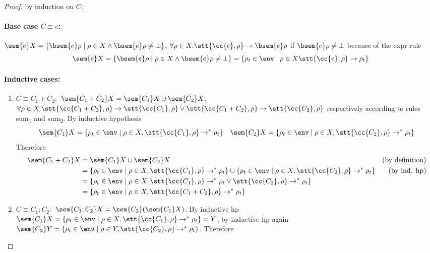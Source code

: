 \begin{proof}
  by induction on \(C\):
  \paragraph*{Base case \(C \equiv e\):\\}
  \(\sem{e}X = \{\bsem{e}\rho \mid \rho \in X \wedge \bsem{e}\rho \neq
  \bot \}\), \(\forall \rho \in X . \stt{\cc{e}, \rho} \to \bsem{e}\rho\)
  if \(\bsem{e}\rho \neq \bot\) because of the expr rule \[\sem{e}X =
  \{\bsem{e}\rho \mid \rho \in X \wedge \bsem{e}\rho \neq \bot \} =
  \{\rho_t \in\env \mid \rho \in X \stt{\cc{e}, \rho} \to \rho_t\}\]
  \paragraph*{Inductive cases:\\}
  \begin{enumerate}
  \item \(C \equiv C_1 + C_2:\) \(\sem{C_1 + C_2}X = \sem{C_1}X \cup
    \sem{C_2}X\), \(\forall \rho \in X . \stt{\cc{C_1 + C_2}, \rho} \to
    \stt{\cc{C_1}, \rho} \vee \stt{\cc{C_1 + C_2}, \rho} \to \stt{\cc{C_2}, \rho}\)
    respectively according to rules sum\textsubscript{1} and
    sum\textsubscript{2}. By inductive hypothesis \[\sem{C_1}X =
    \{\rho_t \in\env \mid \rho \in X , \stt{\cc{C_1},\rho} \to^* \rho_t\} \quad
    \sem{C_2}X = \{\rho_t \in\env \mid \rho \in X , \stt{\cc{C_2},\rho} \to^*
    \rho_t\}\] Therefore
    \begin{align*}
      \sem{C_1 + C_2}X & = \sem{C_1}X \cup \sem{C_2}X & \text{(by definition)}\\
      & = \{\rho_t \in\env \mid \rho \in X , \stt{\cc{C_1},\rho} \to^* \rho_t\} \cup \{\rho_t \in\env \mid \rho \in X , \stt{\cc{C_2},\rho} \to^* \rho_t\} & \text{(by ind. hp)}\\
      & = \{\rho_t \in\env \mid \rho \in X, \stt{\cc{C_1},\rho} \to^* \rho_t \vee \stt{\cc{C_2},\rho} \to^* \rho_t\} \\
      & = \{\rho_t \in\env \mid \rho \in X, \stt{\cc{C_1 + C_2}, \rho} \to^* \rho_t\}
    \end{align*}
  \item \(C \equiv C_1;C_2:\) \(\sem{C_1;C_2}X =
    \sem{C_2}(\sem{C_1}X)\). By inductive hp \(\sem{C_1}X = \{\rho_t
    \in\env \mid \rho \in X, \stt{\cc{C_1}, \rho} \to^* \rho_t\} = Y\), by inductive
    hp again \(\sem{C_2}Y = \{\rho_t \in\env \mid \rho \in Y, \stt{\cc{C_2}, \rho}
    \to^* \rho_t\}\). Therefore

\end{enumerate}
\end{proof}
